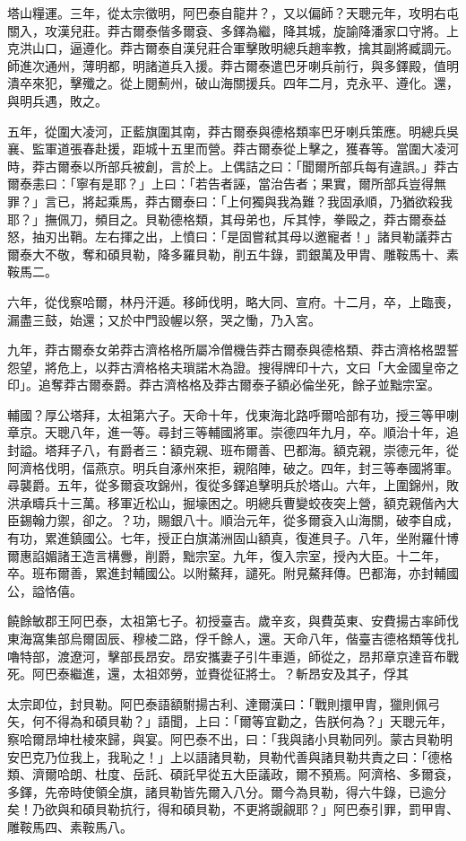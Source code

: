 \begin{pinyinscope}
塔山糧運。三年，從太宗徵明，阿巴泰自龍井？，又以偏師？天聰元年，攻明右屯關入，攻漢兒莊。莽古爾泰偕多爾袞、多鐸為繼，降其城，旋諭降潘家口守將。上克洪山口，逼遵化。莽古爾泰自漢兒莊合軍擊敗明總兵趙率教，擒其副將臧調元。師進次通州，薄明都，明諸道兵入援。莽古爾泰遣巴牙喇兵前行，與多鐸殿，值明潰卒來犯，擊殲之。從上閱薊州，破山海關援兵。四年二月，克永平、遵化。還，與明兵遇，敗之。

五年，從圍大凌河，正藍旗圍其南，莽古爾泰與德格類率巴牙喇兵策應。明總兵吳襄、監軍道張春赴援，距城十五里而營。莽古爾泰從上擊之，獲春等。當圍大凌河時，莽古爾泰以所部兵被創，言於上。上偶詰之曰：「聞爾所部兵每有違誤。」莽古爾泰恚曰：「寧有是耶？」上曰：「若告者誣，當治告者；果實，爾所部兵豈得無罪？」言已，將起乘馬，莽古爾泰曰：「上何獨與我為難？我固承順，乃猶欲殺我耶？」撫佩刀，頻目之。貝勒德格類，其母弟也，斥其悖，拳毆之，莽古爾泰益怒，抽刃出鞘。左右揮之出，上憤曰：「是固嘗弒其母以邀寵者！」諸貝勒議莽古爾泰大不敬，奪和碩貝勒，降多羅貝勒，削五牛錄，罰銀萬及甲胄、雕鞍馬十、素鞍馬二。

六年，從伐察哈爾，林丹汗遁。移師伐明，略大同、宣府。十二月，卒，上臨喪，漏盡三鼓，始還；又於中門設幄以祭，哭之慟，乃入宮。

九年，莽古爾泰女弟莽古濟格格所屬冷僧機告莽古爾泰與德格類、莽古濟格格盟誓怨望，將危上，以莽古濟格格夫瑣諾木為證。搜得牌印十六，文曰「大金國皇帝之印」。追奪莽古爾泰爵。莽古濟格格及莽古爾泰子額必倫坐死，餘子並黜宗室。

輔國？厚公塔拜，太祖第六子。天命十年，伐東海北路呼爾哈部有功，授三等甲喇章京。天聰八年，進一等。尋封三等輔國將軍。崇德四年九月，卒。順治十年，追封謚。塔拜子八，有爵者三：額克親、班布爾善、巴都海。額克親，崇德元年，從阿濟格伐明，偪燕京。明兵自涿州來拒，親陷陣，破之。四年，封三等奉國將軍。尋襲爵。五年，從多爾袞攻錦州，復從多鐸追擊明兵於塔山。六年，上圍錦州，敗洪承疇兵十三萬。移軍近松山，掘壕困之。明總兵曹變蛟夜突上營，額克親偕內大臣錫翰力禦，卻之。？功，賜銀八十。順治元年，從多爾袞入山海關，破李自成，有功，累進鎮國公。七年，授正白旗滿洲固山額真，復進貝子。八年，坐附羅什博爾惠諂媚諸王造言構釁，削爵，黜宗室。九年，復入宗室，授內大臣。十二年，卒。班布爾善，累進封輔國公。以附鰲拜，譴死。附見鰲拜傳。巴都海，亦封輔國公，謚恪僖。

饒餘敏郡王阿巴泰，太祖第七子。初授臺吉。歲辛亥，與費英東、安費揚古率師伐東海窩集部烏爾固辰、穆棱二路，俘千餘人，還。天命八年，偕臺吉德格類等伐扎嚕特部，渡遼河，擊部長昂安。昂安攜妻子引牛車遁，師從之，昂邦章京達音布戰死。阿巴泰繼進，還，太祖郊勞，並賚從征將士。？斬昂安及其子，俘其

太宗即位，封貝勒。阿巴泰語額駙揚古利、達爾漢曰：「戰則擐甲胄，獵則佩弓矢，何不得為和碩貝勒？」語聞，上曰：「爾等宜勸之，告朕何為？」天聰元年，察哈爾昂坤杜棱來歸，與宴。阿巴泰不出，曰：「我與諸小貝勒同列。蒙古貝勒明安巴克乃位我上，我恥之！」上以語諸貝勒，貝勒代善與諸貝勒共責之曰：「德格類、濟爾哈朗、杜度、岳託、碩託早從五大臣議政，爾不預焉。阿濟格、多爾袞，多鐸，先帝時使領全旗，諸貝勒皆先爾入八分。爾今為貝勒，得六牛錄，已逾分矣！乃欲與和碩貝勒抗行，得和碩貝勒，不更將覬覦耶？」阿巴泰引罪，罰甲胄、雕鞍馬四、素鞍馬八。


\end{pinyinscope}
